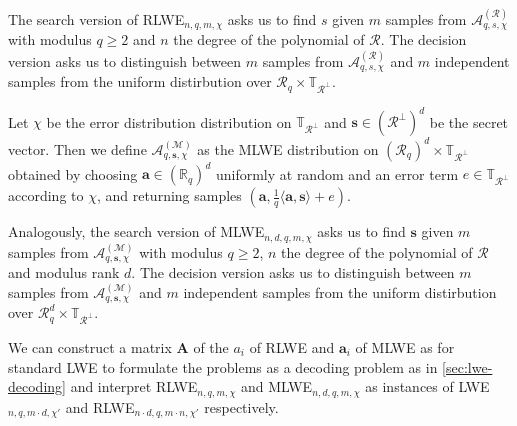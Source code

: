 The search version of RLWE$_{n, q, m, \chi}$ asks us to find $s$ given $m$ samples from $\mathcal{A}_{q, s, \chi}^{(\mathcal{R})}$ with modulus $q\geq 2$ and $n$ the degree of the polynomial of $\mathcal{R}$. The decision version asks us to distinguish between $m$ samples from $\mathcal{A}_{q, s, \chi}^{(\mathcal{R})}$ and $m$ independent samples from the uniform distirbution over $\mathcal{R}_q \times \mathbb{T}_{\mathcal{R}^\perp}$.

\begin{definition}
    Let $\chi$ be the error distribution distribution on $\mathbb{T}_{\mathcal{R}^\perp}$ and $\mathbf{s} \in (\mathcal{R}^\perp)^d$ be the secret vector. Then we define $\mathcal{A}_{q, \mathbf{s}, \chi}^{(\mathcal{M})}$ as the MLWE distribution on $(\mathcal{R}_q)^d \times \mathbb{T}_{\mathcal{R}^\perp}$ obtained by choosing $\mathbf{a} \in (\mathbb{R}_q)^d$ uniformly at random and an error term $e \in \mathbb{T}_{\mathcal{R}^\perp}$ according to $\chi$, and returning samples $(\mathbf{a}, \frac{1}{q}\langle \mathbf{a},\mathbf{s}\rangle + e)$.
\end{definition}

Analogously, the search version of MLWE$_{n, d, q, m, \chi}$ asks us to find $\mathbf{s}$ given $m$ samples from $\mathcal{A}_{q, \mathbf{s}, \chi}^{(\mathcal{M})}$ with modulus $q\geq 2$, $n$ the degree of the polynomial of $\mathcal{R}$ and modulus rank $d$. The decision version asks us to distinguish between $m$ samples from $\mathcal{A}_{q, \mathbf{s}, \chi}^{(\mathcal{M})}$ and $m$ independent samples from the uniform distirbution over $\mathcal{R}_q^d \times \mathbb{T}_{\mathcal{R}^\perp}$.

We can construct a matrix $\mathbf{A}$ of the $a_i$ of RLWE and $\mathbf{a}_i$ of MLWE as for standard LWE to formulate the problems as a decoding problem as in \cref{sec:lwe-decoding} and interpret RLWE$_{n, q, m, \chi}$ and MLWE$_{n, d, q, m, \chi}$ as instances of LWE$_{n, q, m \cdot d, \chi'}$ and RLWE$_{n\cdot d, q, m \cdot n, \chi'}$ respectively.

